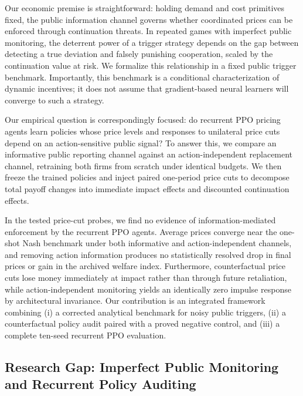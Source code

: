 \documentclass{article}
\begin{document}
Our economic premise is straightforward: holding demand and cost primitives fixed, the public information channel governs whether coordinated prices can be enforced through continuation threats. In repeated games with imperfect public monitoring, the deterrent power of a trigger strategy depends on the gap between detecting a true deviation and falsely punishing cooperation, scaled by the continuation value at risk. We formalize this relationship in a fixed public trigger benchmark. Importantly, this benchmark is a conditional characterization of dynamic incentives; it does not assume that gradient-based neural learners will converge to such a strategy.

Our empirical question is correspondingly focused: do recurrent PPO pricing agents learn policies whose price levels and responses to unilateral price cuts depend on an action-sensitive public signal? To answer this, we compare an informative public reporting channel against an action-independent replacement channel, retraining both firms from scratch under identical budgets. We then freeze the trained policies and inject paired one-period price cuts to decompose total payoff changes into immediate impact effects and discounted continuation effects.

In the tested price-cut probes, we find no evidence of information-mediated enforcement by the recurrent PPO agents. Average prices converge near the one-shot Nash benchmark under both informative and action-independent channels, and removing action information produces no statistically resolved drop in final prices or gain in the archived welfare index. Furthermore, counterfactual price cuts lose money immediately at impact rather than through future retaliation, while action-independent monitoring yields an identically zero impulse response by architectural invariance. Our contribution is an integrated framework combining (i) a corrected analytical benchmark for noisy public triggers, (ii) a counterfactual policy audit paired with a proved negative control, and (iii) a complete ten-seed recurrent PPO evaluation.

\subsection{Research Gap: Imperfect Public Monitoring and Recurrent Policy Auditing}
\end{document}
